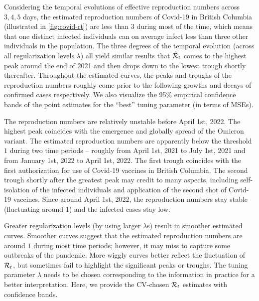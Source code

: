 Considering the temporal evolutions of effective reproduction numbers across $3, 4, 5$ days, the estimated reproduction numbers of Covid-19 in British Columbia (illustrated in \autoref{fig:covid-rt}) are less than $3$ during most of the time, which means that one distinct infected individuals can on average infect less than three other individuals in the population. The three degrees of the temporal evolution (across all regularization levels $\lambda$) all yield similar results that $\hat{\mathcal{R}}_t$ comes to the highest peak around the end of 2021 and then drops down to the lowest trough shortly thereafter. Throughout the estimated curves, the peaks and troughs of the reproduction numbers roughly come prior to the following growths and decays of confirmed cases respectively.
We also visualize the 95\% empirical confidence bands of the point estimates for the ``best'' tuning parameter (in terms of MSEs). 

The reproduction numbers are relatively unstable before April 1st, 2022. The highest peak coincides with the emergence and globally spread of the Omicron variant. The estimated reproduction numbers are apparently below the threshold $1$ during two time periods -- roughly from April 1st, 2021 to July 1st, 2021 and from January 1st, 2022 to April 1st, 2022. The first trough coincides with the first authorization for use of Covid-19 vaccines in British Columbia. The second trough shortly after the greatest peak may credit to many aspects, including self-isolation of the infected individuals and application of the second shot of Covid-19 vaccines. Since around April 1st, 2022, the reproduction numbers stay stable (fluctuating around $1$) and the infected cases stay low. 

Greater regularization levels (by using larger $\lambda$s) result in smoother
estimated curves. Smoother curves suggest that the estimated reproduction
numbers are around $1$ during most time periods; however, it may miss to capture
some outbreaks of the pandemic. More wiggly curves better reflect the
fluctuation of $\mathcal{R}_t$, but sometimes fail to highlight the significant peaks
or troughs. The tuning parameter $\lambda$ needs to be chosen corresponding to
the information in practice for a better interpretation. Here, we provide the
CV-chosen $\mathcal{R}_t$ estimates with confidence bands. 

